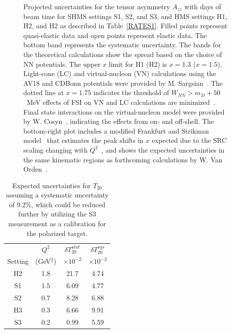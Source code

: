 \begin{figure}
\begin{center}
\caption{\label{PROJ}Projected uncertainties for the tensor asymmetry $A_{zz}$ with \productiondays days of beam time for SHMS settings S1, S2, and S3, and HMS settings H1, H2, and H2 as described in Table~\ref{RATES1}. Filled points represent quasi-elastic data and open points represent elastic data. The bottom band represents the systematic uncertainty. The bands for the theoretical calculations show the spread based on the choice of NN potentials. The upper $x$ limit for H1 (H2) is $x=1.3$ ($x=1.5$). Light-cone (LC) and virtual-nucleon (VN) calculations using the AV18 and CDBonn potentials were provided by M. Sargsian~\cite{Sargsian:2014fla}. The dotted line at $x=1.75$ indicates the threshold of $W_{NN}>m_D+50$~MeV effects of FSI on VN and LC calculations are minimized~\cite{Frankfurt:1993sp}. Final state interactions on the virtual-nucleon model were provided by W. Cosyn~\cite{cosyn-convo}, indicating the effects from on- and off-shell. The bottom-right plot includes a modified Frankfurt and Strikman model~\cite{Frankfurt:1988nt} that estimates the peak shifts in $x$ expected due to the SRC scaling changing with $Q^2$~\cite{Frankfurt:2008zv}, and shows the expected uncertainties in the same kinematic regions as forthcoming calculations by W. Van Orden~\cite{vanorden-convo}.
}
\end{center}
\end{figure}



\begin{table}
\begin{center}
\begin{tabular}{c|c|c|c}
		& $Q^2$    	& $\delta T_{20}^{stat}$	&  $\delta T_{20}^{sys}$ \\
Setting	& (GeV$^2$)	& $\times 10^{-2}$		& $\times 10^{-2}$ \\
\hline\hline
H2 		& 1.8		&  21.7					& 4.74 \\  
S1 		& 1.5		&  6.09					& 4.77 \\
S2 		& 0.7		&  8.28					& 6.88 \\  
H3 		& 0.3		&  6.66					& 9.91 \\  
S3 		& 0.2		&  0.99					& 5.59 \\
  
\hline\hline
\end{tabular}
\caption{\label{RATES-T20}Expected uncertainties for $T_{20}$ assuming a systematic uncertainty of 9.2\%, which could be reduced further by utilizing the S3 measurement as a calibration for the polarized target.}
\end{center}
\end{table}

